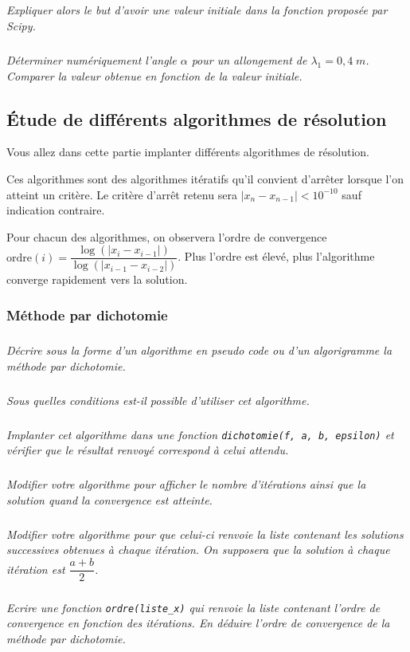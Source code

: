 \documentclass[10pt]{article}
\begin{document}
\subparagraph{}
\textit{Expliquer alors le but d'avoir une valeur initiale dans la fonction proposée par Scipy.}

\subparagraph{}
\textit{Déterminer numériquement l'angle $\alpha$ pour un allongement de $\lambda_1={0,4}\; m$. Comparer la valeur obtenue en fonction de la valeur initiale.}


\subsection{\'Etude de différents algorithmes de résolution}
Vous allez dans cette partie implanter différents algorithmes de résolution.

Ces algorithmes sont des algorithmes itératifs qu'il convient d'arrêter lorsque l'on atteint un critère.
Le critère d'arrêt retenu sera $|x_{n}-x_{n-1}| < 10^{-10}$ sauf indication contraire.

Pour chacun des algorithmes, on observera l'ordre de convergence $\textrm{ordre}(i) = \dfrac{\log(|x_{i}-x_{i-1}|)}{\log(|x_{i-1}-x_{i-2}|)}$. Plus l'ordre est élevé, plus l'algorithme converge rapidement vers la solution.

\subsubsection{Méthode par dichotomie}

\subparagraph{}
\textit{Décrire sous la forme d'un algorithme en pseudo code ou d'un algorigramme la méthode par dichotomie.}

\subparagraph{}
\textit{Sous quelles conditions est-il possible d'utiliser cet algorithme.}

\subparagraph{}\textit{Implanter cet algorithme dans une fonction \texttt{dichotomie(f, a, b, epsilon)} et vérifier que le résultat renvoyé correspond à celui attendu.}


\subparagraph{}\textit{Modifier votre algorithme pour afficher le nombre d'itérations ainsi que la solution quand la convergence est atteinte.}

\subparagraph{}\textit{Modifier votre algorithme pour que celui-ci renvoie la liste contenant les solutions successives obtenues à chaque itération. On supposera que la solution à chaque itération est $\dfrac{a+b}{2}$.}

\subparagraph{}\textit{Ecrire une fonction \texttt{ordre(liste\_x)} qui renvoie la liste contenant l'ordre de convergence en fonction des itérations. En déduire l'ordre de convergence de la méthode par dichotomie.}
\end{document}

